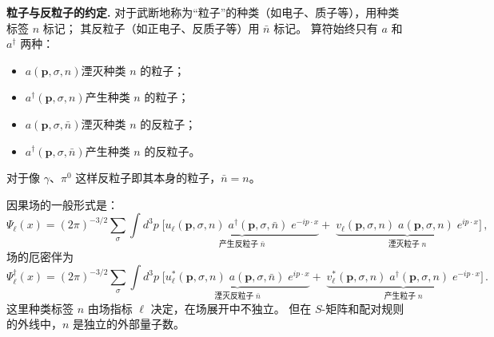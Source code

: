\bigskip\noindent
\textbf{粒子与反粒子的约定.}\;
对于武断地称为``粒子''的种类（如电子、质子等），用种类标签 $n$ 标记；
其反粒子（如正电子、反质子等）用 $\bar{n}$ 标记。
算符始终只有 $a$ 和 $a^\dagger$ 两种：
\begin{itemize}
  \item $a(\boldsymbol{p},\sigma,n)$\;湮灭种类 $n$ 的粒子；
  \item $a^\dagger(\boldsymbol{p},\sigma,n)$\;产生种类 $n$ 的粒子；
  \item $a(\boldsymbol{p},\sigma,\bar{n})$\;湮灭种类 $n$ 的反粒子；
  \item $a^\dagger(\boldsymbol{p},\sigma,\bar{n})$\;产生种类 $n$ 的反粒子。
\end{itemize}
对于像 $\gamma$、$\pi^0$ 这样反粒子即其本身的粒子，$\bar{n}=n$。

\medskip\noindent
因果场的一般形式是：
\begin{equation}
\Psi_\ell(x)
= (2\pi)^{-3/2}\sum_\sigma\int d^3p\;\Big[
  \underbrace{u_\ell(\boldsymbol{p},\sigma,n)\;
    a^{\dagger}(\boldsymbol{p},\sigma,\bar{n})\;e^{-ip\cdot x}
  }_{\text{产生反粒子}\;\bar{n}}
  +\;
  \underbrace{v_\ell(\boldsymbol{p},\sigma,n)\;
    a(\boldsymbol{p},\sigma,n)\;e^{ip\cdot x}
  }_{\text{湮灭粒子}\;n}
\Big]\,,
\label{eq:field}
\end{equation}
场的厄密伴为
\begin{equation}
\Psi_\ell^\dagger(x)
= (2\pi)^{-3/2}\sum_\sigma\int d^3p\;\Big[
  \underbrace{u_\ell^*(\boldsymbol{p},\sigma,n)\;
    a(\boldsymbol{p},\sigma,\bar{n})\;e^{ip\cdot x}
  }_{\text{湮灭反粒子}\;\bar{n}}
  +\;
  \underbrace{v_\ell^*(\boldsymbol{p},\sigma,n)\;
    a^\dagger(\boldsymbol{p},\sigma,n)\;e^{-ip\cdot x}
  }_{\text{产生粒子}\;n}
\Big]\,.
\label{eq:field-dag}
\end{equation}
这里种类标签 $n$ 由场指标 $\ell$ 决定，在场展开中不独立。
但在 $S$-矩阵和配对规则的外线中，$n$ 是独立的外部量子数。

